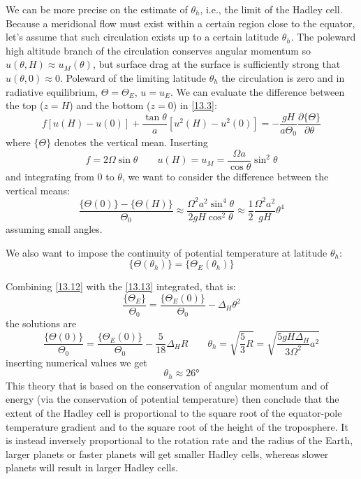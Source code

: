We can be more precise on the estimate of $\theta_h$, i.e., the limit of the Hadley cell. Because a meridional flow must exist within a certain region close to the equator, let's assume that such circulation exists up to a certain latitude $\theta_h$. The poleward high altitude branch of the circulation conserves angular momentum so  $u(\theta,H)\approx u_M(\theta)$, but surface drag at the surface is sufficiently strong that $u(\theta,0)\approx 0$. Poleward of the limiting latitude $\theta_h$ the circulation is zero and in radiative equilibrium, $\Theta=\Theta_E$, $u=u_E$. We can evaluate the difference between the top ($z=H$) and the bottom ($z=0$) in \ref{13.3}:
\begin{equation}\label{13.10}
	f[u(H)-u(0)]+\frac{\tan\theta}{a}[u^2(H)-u^2(0)]=-\frac{gH}{a\Theta_0}\frac{\partial\{\Theta\}}{\partial\theta}
\end{equation}
where $\{\Theta\}$ denotes the vertical mean. Inserting
$$f=2\Omega\sin\theta\qquad u(H)=u_M=\frac{\Omega a}{\cos\theta}\sin^2\theta$$
and integrating from $0$ to $\theta$, we want to consider the difference between the vertical means:
\begin{equation}\label{13.12}
	\frac{\{\Theta(0)\}-\{\Theta(H)\}}{\Theta_0}\approx\frac{\Omega^2a^2\sin^4\theta}{2gH\cos^2\theta}\approx \frac{1}{2}\frac{\Omega^2a^2}{gH}\theta^4
\end{equation}
assuming small angles.

We also want to impose the continuity of potential temperature at latitude $\theta_h$:
\begin{equation}\label{13.13}
	\{\Theta(\theta_h)\}=\{\Theta_E(\theta_h)\}
\end{equation}

Combining \ref{13.12} with the \ref{13.13} integrated, that is:
$$\frac{\{\Theta_E\}}{\Theta_0}=\frac{\{\Theta_E(0)\}}{\Theta_0}-\Delta_H\theta^2$$
the solutions are
\begin{equation}
	\frac{\{\Theta(0)\}}{\Theta_0}=\frac{\{\Theta_E(0)\}}{\Theta_0}-\frac{5}{18}\Delta_HR\qquad \theta_h=\sqrt{\frac{5}{3}R}=\sqrt{\frac{5gH\Delta_H}{3\Omega^2}a^2}
\end{equation}
inserting numerical values we get
\begin{equation}\label{thetahadl}
	\theta_h\approx  26\text{°}
\end{equation}
This theory that is based on the conservation of angular momentum and of energy (via the conservation of potential temperature) then conclude that the extent of the Hadley cell is proportional to the square root of the equator-pole temperature gradient and to the square root of the height of the troposphere. It is instead inversely proportional to the rotation rate and the radius of the Earth, larger planets or faster planets will get smaller Hadley cells, whereas slower planets will result in larger Hadley cells.\\



